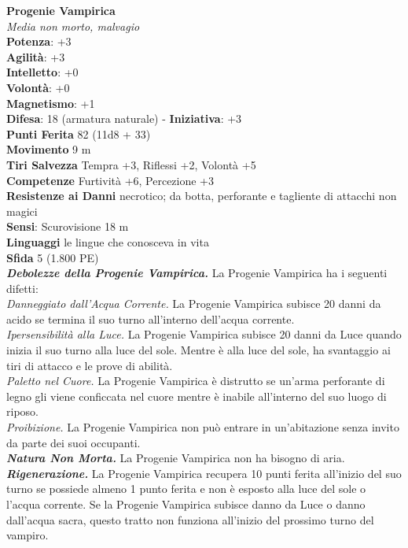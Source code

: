 \begin{multicols}{2}
\medskip\textbf{Progenie Vampirica}\\
\emph{Media non morto, malvagio}\\
\textbf{Potenza}: +3\\
\textbf{Agilità}: +3\\
\textbf{Intelletto}: +0\\
\textbf{Volontà}: +0\\
\textbf{Magnetismo}: +1\\
\textbf{Difesa}: 18 (armatura naturale) - \textbf{Iniziativa}: +3\\
\textbf{Punti Ferita} 82 (11d8 + 33)\\
\textbf{Movimento} 9 m\\
\textbf{Tiri Salvezza} Tempra +3, Riflessi +2, Volontà +5\\
\textbf{Competenze} Furtività +6, Percezione +3\\
\textbf{Resistenze ai Danni} necrotico; da botta, perforante e tagliente di attacchi non magici\\
\textbf{Sensi}: Scurovisione 18 m \\
\textbf{Linguaggi} le lingue che conosceva in vita\\
\textbf{Sfida} 5 (1.800 PE)\smallskip\\
\emph{\textbf{Debolezze della Progenie Vampirica.}} La Progenie Vampirica ha i seguenti difetti:\\
\emph{Danneggiato dall'Acqua Corrente.} La Progenie Vampirica subisce 20 danni da acido se termina il suo turno all'interno dell'acqua corrente.\\
\emph{Ipersensibilità alla Luce.} La Progenie Vampirica subisce 20 danni da Luce quando inizia il suo turno alla luce del sole. Mentre è alla luce del sole, ha svantaggio ai tiri di attacco e le prove di abilità.\\
\emph{Paletto nel Cuore.} La Progenie Vampirica è distrutto se un'arma perforante di legno gli viene conficcata nel cuore mentre è inabile all'interno del suo luogo di riposo.\\
\emph{Proibizione.} La Progenie Vampirica non può entrare in un'abitazione senza invito da parte dei suoi occupanti.\\
\emph{\textbf{Natura Non Morta.}} La Progenie Vampirica non ha bisogno di aria.\\

\emph{\textbf{Rigenerazione.}} La Progenie Vampirica recupera 10 punti ferita all'inizio del suo turno se possiede almeno 1 punto ferita e non è esposto alla luce del sole o l'acqua corrente. Se la Progenie Vampirica subisce danno da Luce o danno dall'acqua sacra, questo tratto non funziona all'inizio del prossimo turno del vampiro.\\


\end{multicols}
